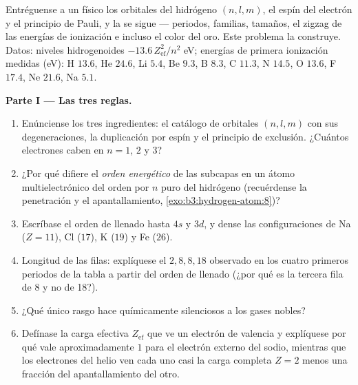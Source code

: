 \begin{problem}\label{pb:b3:identical-particles:1}
Entréguense a un físico los orbitales del hidrógeno $(n, l, m)$, el espín
del electrón y el principio de Pauli, y la  se sigue ---
periodos, familias, tamaños, el zigzag de las energías de ionización e
incluso el color del oro. Este problema la construye. Datos: niveles
hidrogenoides $-13.6\,Z_{\text{ef}}^2/n^2$ eV; energías de primera
ionización medidas (eV): H $13.6$, He $24.6$, Li $5.4$, Be $9.3$, B $8.3$,
C $11.3$, N $14.5$, O $13.6$, F $17.4$, Ne $21.6$, Na $5.1$.

\medskip\noindent\textbf{Parte I --- Las tres reglas.}
\begin{enumerate}
  \item Enúnciense los tres ingredientes: el catálogo de orbitales
        $(n, l, m)$ con sus degeneraciones, la duplicación por espín y
        el principio de exclusión. ¿Cuántos electrones caben en $n = 1$,
        $2$ y $3$?
  \item ¿Por qué difiere el \emph{orden energético} de las subcapas en un
        átomo multielectrónico del orden por $n$ puro del hidrógeno
        (recuérdense la penetración y el apantallamiento,
        \cref{exo:b3:hydrogen-atom:8})?
  \item Escríbase el orden de llenado hasta $4s$ y $3d$, y dense
        las configuraciones de Na ($Z = 11$), Cl ($17$), K ($19$)
        y Fe ($26$).
  \item Longitud de las filas: explíquese el $2, 8, 8, 18$ observado en los
        cuatro primeros periodos de la tabla a partir del orden de llenado
        (¿por qué es la tercera fila de 8 y no de 18?).
  \item ¿Qué único rasgo hace químicamente silenciosos a los gases
        nobles?
  \item Defínase la carga efectiva $Z_{\text{ef}}$ que ve un
        electrón de valencia y explíquese por qué vale aproximadamente $1$
        para el electrón externo del sodio, mientras que los electrones del
        helio ven cada uno casi la carga completa $Z = 2$ menos una
        fracción del apantallamiento del otro.
\end{enumerate}


\end{problem}
